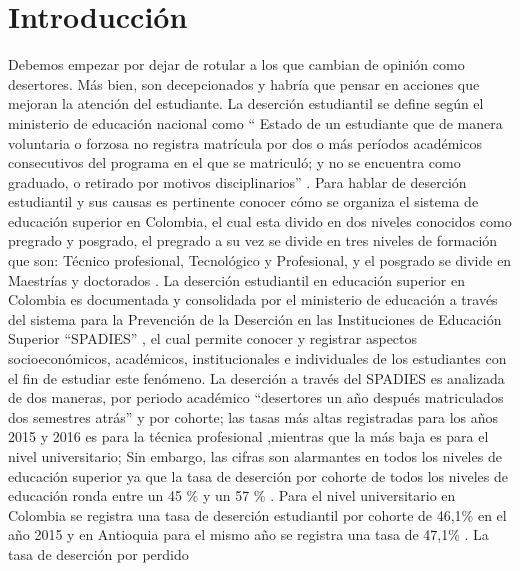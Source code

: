 \documentclass[]{article}
\author{}
\date{}
\begin{document}
	
%




\vskip 6.5pt


\noindent  \hypertarget{introduccion}{%
\section{Introducción}\label{introduccion}}

Debemos empezar por dejar de rotular a los que cambian de opinión como
desertores. Más bien, son decepcionados y habría que pensar en acciones
que mejoran la atención del estudiante. \citet{devries2011dod} La
deserción estudiantil se define según el ministerio de educación
nacional como `` Estado de un estudiante que de manera voluntaria o
forzosa no registra matrícula por dos o más períodos académicos
consecutivos del programa en el que se matriculó; y no se encuentra como
graduado, o retirado por motivos disciplinarios''
\citep{MinisteriodeEducacionNacional}. Para hablar de deserción
estudiantil y sus causas es pertinente conocer cómo se organiza el
sistema de educación superior en Colombia, el cual esta divido en dos
niveles conocidos como pregrado y posgrado, el pregrado a su vez se
divide en tres niveles de formación que son: Técnico profesional,
Tecnológico y Profesional, y el posgrado se divide en Maestrías y
doctorados \citep{MinisteriodeeducacionNacionala}. La deserción
estudiantil en educación superior en Colombia es documentada y
consolidada por el ministerio de educación a través del sistema para la
Prevención de la Deserción en las Instituciones de Educación Superior
``SPADIES'' \citep{MinisteriodeeducacionNacional1}, el cual permite
conocer y registrar aspectos socioeconómicos, académicos,
institucionales e individuales de los estudiantes con el fin de estudiar
este fenómeno. La deserción a través del SPADIES es analizada de dos
maneras, por periodo académico ``desertores un año después matriculados
dos semestres atrás'' y por cohorte; las tasas más altas registradas
para los años 2015 y 2016 es para la técnica profesional ,mientras que
la más baja es para el nivel universitario; Sin embargo, las cifras son
alarmantes en todos los niveles de educación superior ya que la tasa de
deserción por cohorte de todos los niveles de educación ronda entre un
45 \% y un 57 \% \citep{SPADIES2017}. Para el nivel universitario en
Colombia se registra una tasa de deserción estudiantil por cohorte de
46,1\% en el año 2015 y en Antioquia para el mismo año se registra una
tasa de 47,1\% \citep{SPADIES2016}. La tasa de deserción por perdido
\end{document}
